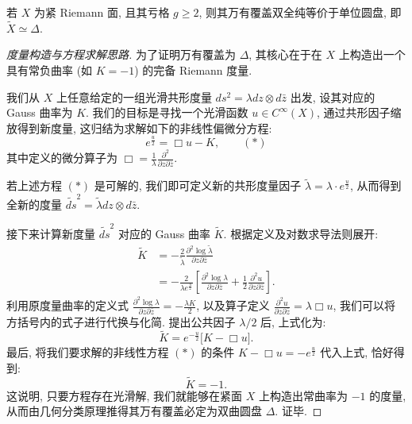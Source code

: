 \begin{theorem}[Poincar\'e]
若 $X$ 为紧 Riemann 面, 且其亏格 $g \geqslant 2$, 则其万有覆盖双全纯等价于单位圆盘, 即 $\widetilde{X} \simeq \Delta$.
\end{theorem}

\begin{proof}[度量构造与方程求解思路]
为了证明万有覆盖为 $\Delta$, 其核心在于在 $X$ 上构造出一个具有常负曲率 (如 $K=-1$) 的完备 Riemann 度量. 

我们从 $X$ 上任意给定的一组光滑共形度量 $ds^2 = \lambda dz \otimes d\bar{z}$ 出发, 设其对应的 Gauss 曲率为 $K$. 我们的目标是寻找一个光滑函数 $u \in C^\infty(X)$, 通过共形因子缩放得到新度量, 这归结为求解如下的非线性偏微分方程:
\[ e^{\frac{u}{2}} = \Box u - K, \qquad (*)\]
其中定义的微分算子为 $\Box = \frac{1}{\lambda} \frac{\partial^2}{\partial z \partial \bar{z}}$.

若上述方程 $(*)$ 是可解的, 我们即可定义新的共形度量因子 $\widetilde{\lambda} = \lambda \cdot e^{\frac{u}{2}}$, 从而得到全新的度量 $\widetilde{ds}^2 = \widetilde{\lambda} dz \otimes d\bar{z}$.

接下来计算新度量 $\widetilde{ds}^2$ 对应的 Gauss 曲率 $\widetilde{K}$. 根据定义及对数求导法则展开:
\begin{align*}
\widetilde{K} &= - \frac{2}{\widetilde{\lambda}} \frac{\partial^2 \log \widetilde{\lambda}}{\partial z \partial \bar{z}} \\
&= - \frac{2}{\lambda e^{\frac{u}{2}}} \left[ \frac{\partial^2 \log \lambda}{\partial z \partial \bar{z}} + \frac{1}{2} \frac{\partial^2 u}{\partial z \partial \bar{z}} \right].
\end{align*}
利用原度量曲率的定义式 $\frac{\partial^2 \log \lambda}{\partial z \partial \bar{z}} = -\frac{\lambda K}{2}$, 以及算子定义 $\frac{\partial^2 u}{\partial z \partial \bar{z}} = \lambda \Box u$, 我们可以将方括号内的式子进行代换与化简. 提出公共因子 $\lambda/2$ 后, 上式化为:
\[ \widetilde{K} = e^{-\frac{u}{2}} \big[ K - \Box u \big]. \]
最后, 将我们要求解的非线性方程 $(*)$ 的条件 $K - \Box u = -e^{\frac{u}{2}}$ 代入上式, 恰好得到:
\[ \widetilde{K} = -1. \]
这说明, 只要方程存在光滑解, 我们就能够在紧面 $X$ 上构造出常曲率为 $-1$ 的度量, 从而由几何分类原理推得其万有覆盖必定为双曲圆盘 $\Delta$. 证毕.
\end{proof}
